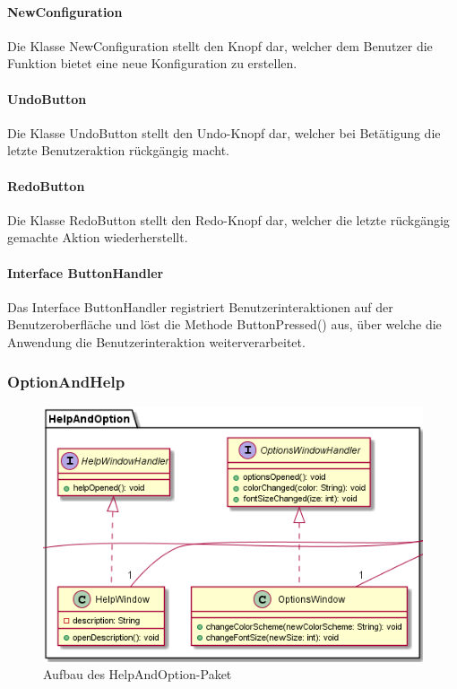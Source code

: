 \documentclass[parskip=full]{scrartcl}
\begin{document}
\paragraph{NewConfiguration}

Die Klasse NewConfiguration stellt den Knopf dar, welcher dem Benutzer die Funktion bietet eine neue Konfiguration zu erstellen.

\paragraph{UndoButton}

Die Klasse UndoButton stellt den Undo-Knopf dar, welcher bei Betätigung die letzte Benutzeraktion rückgängig macht.

\paragraph{RedoButton}

Die Klasse RedoButton stellt den Redo-Knopf dar, welcher die letzte rückgängig gemachte Aktion wiederherstellt.

\paragraph{Interface ButtonHandler}

Das Interface ButtonHandler registriert Benutzerinteraktionen auf der Benutzeroberfläche und löst die Methode ButtonPressed() aus, über welche die Anwendung die Benutzerinteraktion weiterverarbeitet.

\subsubsection{OptionAndHelp}

\begin{figure}[htbp]
	\begin{center}
		\includegraphics[width = 14cm]{Grafiken/View/HelpAndOptionNamespace.png}
		\caption{Aufbau des HelpAndOption-Paket}
		\label{Entwurf_Grob}
	\end{center}
\end{figure}
\end{document}
